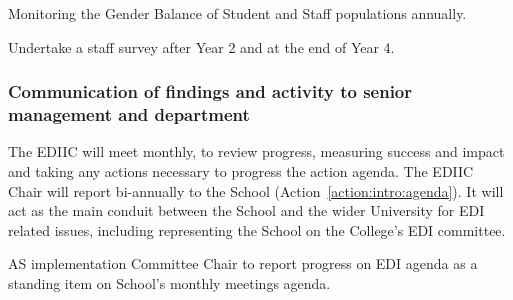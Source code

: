 
\newcommand{\actgenbalpopsurvey}{Monitoring the Gender Balance of Student and Staff populations annually.
}
\begin{action}[label=action:gender:population:survey]{}
\actgenbalpopsurvey
\hfill{
    \hypersetup{hidelinks}
    \hyperlink{a3}{\gotoactionsymbol{}}
}
\end{action}

\newcommand{\actstaffsurvey}{Undertake a staff survey after Year 2 and at the end of Year 4.
}
\begin{action}[label=action:staff:survey]{}
\actstaffsurvey
\hfill{
    \hypersetup{hidelinks}
    \hyperlink{a3}{\gotoactionsymbol{}}
}
\end{action}



\subsubsection{Communication of findings and activity to senior management and department}

The EDIIC will meet monthly, to review progress, measuring success and impact and taking any actions necessary to progress the action agenda. The EDIIC Chair will report bi-annually to the School (Action~\ref{action:intro:agenda}).
It will act as the main conduit between the School and the wider University for EDI related issues, including representing the School on the College's EDI committee.


\newcommand{\actintroagenda}{
AS implementation Committee Chair to report progress on EDI agenda as a standing item on School’s monthly meetings agenda.
}
\begin{action}[label=action:intro:agenda]{}
\actintroagenda
\hfill{
    \hypersetup{hidelinks}
    \hyperlink{a5}{\gotoactionsymbol{}}
}
\end{action}







